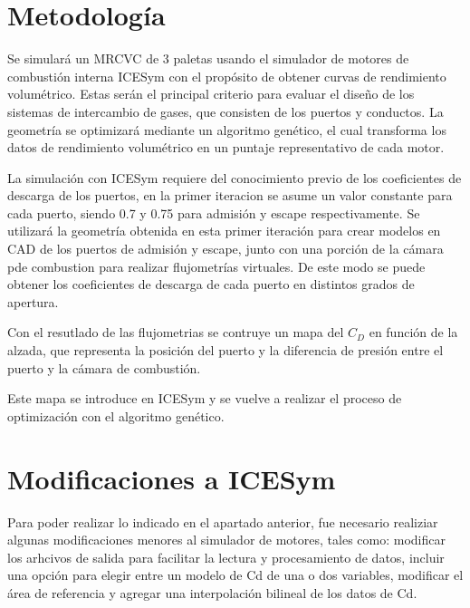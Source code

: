 
\section{Metodología}
%
Se simulará un MRCVC de 3 paletas usando el simulador de motores de combustión
interna ICESym \cite{icesym} con el propósito de obtener curvas de rendimiento
volumétrico.
%
Estas serán el principal criterio para evaluar el diseño de los sistemas de
intercambio de gases, que consisten de los puertos y conductos.
%
La geometría se optimizará mediante un algoritmo genético, el cual transforma
los datos de rendimiento volumétrico en un puntaje representativo de cada
motor.


La simulación con ICESym requiere del conocimiento previo de los coeficientes
de descarga de los puertos, en la primer iteracion se asume un valor constante
para cada puerto, siendo 0.7 y 0.75 para admisión y escape respectivamente.
%
Se utilizará la geometría obtenida en esta primer iteración para crear modelos
en CAD de los puertos de admisión y escape, junto con una porción de la cámara
pde combustion para realizar flujometrías virtuales.
%
De este modo se puede obtener los coeficientes de descarga de cada puerto en
distintos grados de apertura.

Con el resutlado de las flujometrias se contruye un mapa del $C_D$ en función
de la alzada, que representa la posición del puerto y la diferencia de presión
entre el puerto y la cámara de combustión.

Este mapa se introduce en ICESym y se vuelve a realizar el proceso de optimización
con el algoritmo genético.

\section{Modificaciones a ICESym}
%
Para poder realizar lo indicado en el apartado anterior, fue necesario
realiziar algunas modificaciones menores al simulador de motores, tales como:
modificar los arhcivos de salida para facilitar la lectura y procesamiento de
datos, incluir una opción para elegir entre un modelo de Cd de una o dos
variables, modificar el área de referencia y  agregar una interpolación
bilineal de los datos de Cd.

